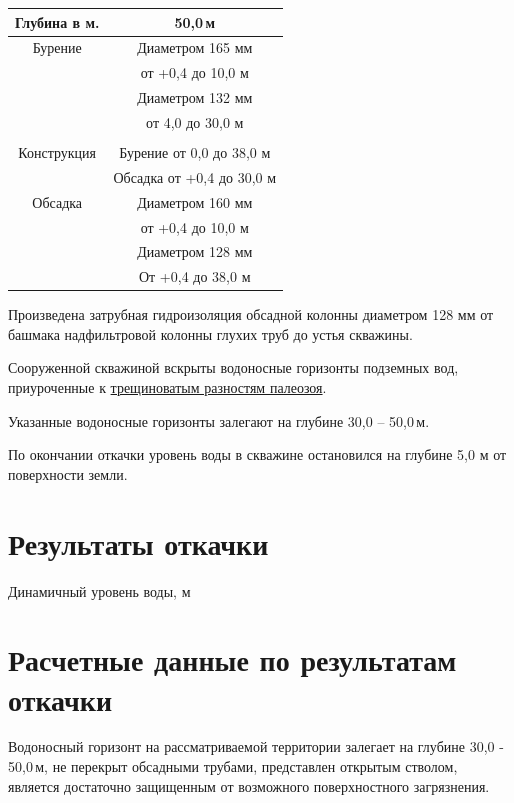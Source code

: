 \documentclass[a4paper,12pt]{article} %
\newcommand{\txtDepth}{50,0}						%
\newcommand{\txtGeology}{трещиноватым разностям палеозоя}
\begin{document}
\bigskip

\begin{center}
\begin{tabular}{|c|c|}
	\hline 
	Глубина в м. & \txtDepth \,м \\ 
	\hline 
	Бурение & Диаметром 165 мм \\ 
	& от +0,4 до 10,0 м \\ 
	& Диаметром 132 мм \\ 
	& от 4,0 до 30,0 м \\ 
	&  \\ 
	\hline 
	Конструкция & Бурение от 0,0 до 38,0 м \\ 
	& Обсадка от +0,4 до 30,0 м \\ 
	\hline 
	Обсадка & Диаметром 160 мм \\ 
	& от +0,4 до 10,0 м \\ 
	& Диаметром 128 мм  \\ 
	& От +0,4 до 38,0 м \\ 
	\hline 
\end{tabular} 
\end{center}

\bigskip

Произведена затрубная гидроизоляция обсадной колонны диаметром 128 мм от башмака надфильтровой колонны глухих труб до устья скважины.

Сооруженной скважиной вскрыты водоносные горизонты  подземных вод, приуроченные к \underline{\txtGeology}.

Указанные водоносные горизонты залегают на глубине   30,0 – \txtDepth \,м.

По окончании откачки уровень воды в скважине остановился на глубине  5,0 м от поверхности земли.

\section*{Результаты откачки}

\begin{sideways} 
	Динамичный уровень воды, м
\end{sideways}

\section*{Расчетные данные по результатам откачки}

Водоносный горизонт на рассматриваемой территории залегает на глубине 	30,0 - \txtDepth	\,м, не перекрыт обсадными трубами, представлен открытым стволом, является достаточно защищенным от возможного поверхностного загрязнения.
\end{document}
